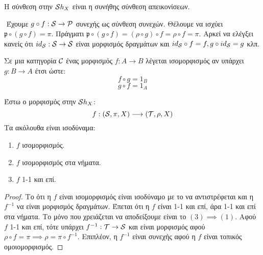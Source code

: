\begin{remark}Η σύνθεση στην $\mathcal{S} h_X$ είναι η συνήθης σύνθεση απεικονίσεων.
\end{remark}
\begin{figure}[H]
    \centering
{}
\end{figure}

$ $\newline
Έχουμε $g \circ f : \mathcal{S} \rightarrow \mathcal{P}$ συνεχής ως σύνθεση συνεχών. Θέλουμε να ισχύει $\mathfrak{p} \circ (g \circ f) = \pi$. Πράγματι $\mathfrak{p} \circ (g \circ f) = (\rho \circ g) \circ f = \rho \circ f = \pi$. Αρκεί να ελέγξει κανείς ότι $id_{\mathcal{S}} : \mathcal{S} \rightarrow \mathcal{S}$ είναι μορφισμός δραγμάτων και $id_{\mathcal{S}} \circ f = f, g \circ id_{\mathcal{S}} = g$ κλπ.



\begin{defn} Σε μια κατηγορία $\mathcal{C}$ ένας μορφισμός $f: A \rightarrow B$ λέγεται ισομορφισμός αν υπάρχει $g : B \rightarrow A$ έτσι ώστε:
    $$f\circ g = 1_B$$
    $$g \circ f = 1_A$$

\end{defn}

\begin{prop} Έστω ο μορφισμός στην $\mathcal{S} h_X$:
    $$f: (\mathcal{S}, \pi, X) \longrightarrow (\mathcal{T},\rho,X)$$ Τα ακόλουθα είναι ισοδύναμα:
    \begin{enumerate}
        \item $f$ ισομορφισμός.
        \item $f$ ισομορφισμός στα νήματα.
        \item $f$ 1-1 και επί.
    \end{enumerate}
\end{prop}

\begin{proof} Το ότι η $f$ είναι ισομορφισμός είναι ισοδύναμο με το να αντιστρέφεται και η $f^{-1}$ να είναι μορφισμός δραγμάτων. Έπεται ότι η $f$ είναι 1-1 και επί, άρα 1-1 και επί στα νήματα. Το μόνο που χρειάζεται να αποδείξουμε είναι το $(3) \implies (1)$. Αφού $f$ 1-1 και επί, τότε υπάρχει $f^{-1}:\mathcal{T} \rightarrow \mathcal{S}$ και είναι μορφισμός αφού $\rho \circ f = \pi \implies \rho = \pi \circ f^{-1}$. Επιπλέον, η $f^{-1}$ είναι συνεχής αφού η $f$ είναι τοπικός ομοιομορφισμός.
\end{proof}

